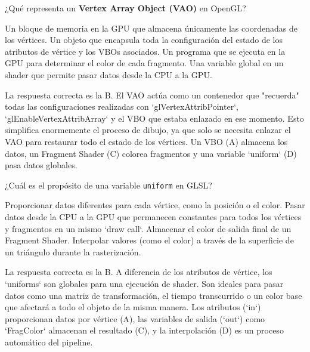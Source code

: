 \documentclass[addpoints,10pt]{exam}
\begin{document}
\begin{questions}
	\question[4]
	¿Qué representa un \textbf{Vertex Array Object (VAO)} en OpenGL?
	\begin{oneparchoices}
		\choice Un bloque de memoria en la GPU que almacena únicamente las coordenadas de los vértices.
		\choice Un objeto que encapsula toda la configuración del estado de los atributos de vértice y los VBOs asociados.
		\choice Un programa que se ejecuta en la GPU para determinar el color de cada fragmento.
		\choice Una variable global en un shader que permite pasar datos desde la CPU a la GPU.
	\end{oneparchoices}
	\begin{solution}
	La respuesta correcta es la B. El VAO actúa como un contenedor que "recuerda" todas las configuraciones realizadas con `glVertexAttribPointer`, `glEnableVertexAttribArray` y el VBO que estaba enlazado en ese momento. Esto simplifica enormemente el proceso de dibujo, ya que solo se necesita enlazar el VAO para restaurar todo el estado de los vértices. Un VBO (A) almacena los datos, un Fragment Shader (C) colorea fragmentos y una variable `uniform` (D) pasa datos globales.
	\end{solution}

	\question[4]
	¿Cuál es el propósito de una variable \texttt{uniform} en GLSL?
	\begin{oneparchoices}
		\choice Proporcionar datos diferentes para cada vértice, como la posición o el color.
		\choice Pasar datos desde la CPU a la GPU que permanecen constantes para todos los vértices y fragmentos en un mismo `draw call`.
		\choice Almacenar el color de salida final de un Fragment Shader.
		\choice Interpolar valores (como el color) a través de la superficie de un triángulo durante la rasterización.
	\end{oneparchoices}
	\begin{solution}
	La respuesta correcta es la B. A diferencia de los atributos de vértice, los `uniforms` son globales para una ejecución de shader. Son ideales para pasar datos como una matriz de transformación, el tiempo transcurrido o un color base que afectará a todo el objeto de la misma manera. Los atributos (`in`) proporcionan datos por vértice (A), las variables de salida (`out`) como `FragColor` almacenan el resultado (C), y la interpolación (D) es un proceso automático del pipeline.
	\end{solution}


\end{questions}
\end{document}
